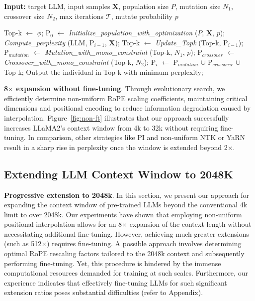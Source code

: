 \begin{algorithm}[t]
	\small
	\caption{The search algorithm}
	\textbf{Input:} target LLM, input samples $\mathbf{X}$,   population size $P$, mutation size $N_1$, crossover size $N_2$, max iterations $\mathcal{T}$, mutate probability $p$\\

	\begin{algorithmic}[1]
		\label{alg:search}
		\STATE Top-k $\leftarrow$ $\phi$;	
		\STATE $\text{P}_0$ $\leftarrow$ \textit{Initialize\_population\_with\_optimization} ($P$, $\mathbf{X}$, $p$);
		\STATE \textit{Compute\_perplexity} (LLM, $\text{P}_{i-1}$, $\mathbf{X}$);
		\STATE Top-k $\leftarrow$ \textit{Update\_Topk} (Top-k, $\text{P}_{i-1}$);
		\STATE $\text{P}_{mutation}$ $\leftarrow$ \textit{Mutation\_with\_mono\_constraint} (Top-k, $N_1$, $p$);
		\STATE $\text{P}_{crossover}$ $\leftarrow$ \textit{Crossover\_with\_mono\_constraint} (Top-k, $N_2$);
		\STATE $\text{P}_i$ $\leftarrow$ $\text{P}_{mutation}$ $\cup$ $\text{P}_{crossover}$ $\cup$ Top-k;
		\ENDFOR
		\STATE Output the individual in Top-k with minimum perplexity;
	\end{algorithmic}
\end{algorithm}

\textbf{8$\times$ expansion without fine-tuning}. Through evolutionary search, we efficiently determine non-uniform RoPE scaling coefficients, maintaining critical dimensions and positional encoding to reduce information degradation caused by interpolation. Figure~\ref{fig:non-ft} illustrates that our approach successfully increases LLaMA2’s context window from 4k to 32k without requiring fine-tuning. In comparison, other strategies like PI and non-uniform NTK or YaRN result in a sharp rise in perplexity once the window is extended beyond 2$\times$.

\subsection{Extending LLM Context Window to 2048K}
\label{sec:extendto2048k}

\textbf{Progressive extension to 2048k}. In this section, we present our approach for expanding the context window of pre-trained LLMs beyond the conventional 4k limit to over 2048k. Our experiments have shown that employing non-uniform positional interpolation allows for an 8$\times$ expansion of the context length without necessitating additional fine-tuning. However, achieving much greater extensions (such as 512$\times$) requires fine-tuning. A possible approach involves determining optimal RoPE rescaling factors tailored to the 2048k context and subsequently performing fine-tuning. Yet, this procedure is hindered by the immense computational resources demanded for training at such scales. Furthermore, our experience indicates that effectively fine-tuning LLMs for such significant extension ratios poses substantial difficulties (refer to Appendix).

